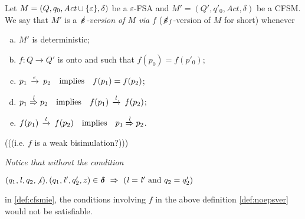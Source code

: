 \begin{definition}
\label{def:noepsver}
Let $M=(Q,q_0,\textit{Act}\cup\{\varepsilon\},\delta)$ be a $\varepsilon$-FSA
and $M'=(Q',q'_0,\textit{Act},\delta)$ be a CFSM.
We say that $M'$ is a {\em $\not\hspace{-1pt}\bm{\varepsilon}$-version of $M$ via $f$} ($\not\hspace{-1pt}\bm{\varepsilon}_f$-version of $M$ for short)
whenever 
\begin{enumerate}[a)]
\item
$M'$ is deterministic;
\item 
$f:Q\to Q'$ is onto and such that $f(p_0) = f(p'_0)$;
\item
$p_1\,\xrightarrow{\epsilon}_{{}}\,p_2 \quad\text{implies}\quad f(p_1)=f(p_2)$; 
\item
$p_1\LTS{\elle}p_2 \quad\text{implies}\quad f(p_1)\lts{\elle}f(p_2)$; 
\item
\label{def:noepsver-e}
$ f(p_1)\lts{\elle}f(p_2)\quad\text{implies}\quad p_1\LTS{\elle}p_2$.
\end{enumerate}
(((i.e. $f$ is a weak bisimulation?)))

\begin{remark}
\label{rem:neccond}
{\em
Notice that without the condition\\
\centerline{
$(q_1,\mathit{l},q_2,\not\iota), (q_1,\mathit{l}',q'_2,z)\in\bm{\delta} ~\Rightarrow~ (\mathit{l}=\mathit{l}' \text{ and } q_2=q'_2)$}
in \cref{def:cfsmie}, the conditions involving $f$ in the above definition \cref{def:noepsver} would not be satisfiable. \finex
}
\end{remark}

\end{definition}



